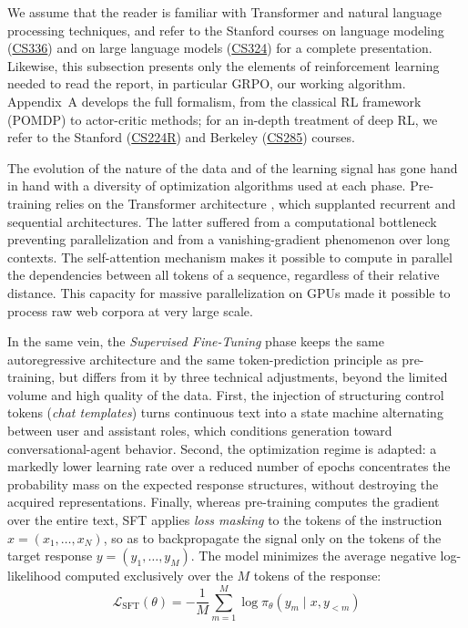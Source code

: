 \documentclass[11pt,a4paper]{article}
\begin{document}
We assume that the reader is familiar with Transformer and natural language processing techniques, and refer to the Stanford courses on language modeling (\href{https://cs336.stanford.edu/}{CS336}) and on large language models (\href{https://stanford-cs324.github.io/winter2022/}{CS324}) for a complete presentation. Likewise, this subsection presents only the elements of reinforcement learning needed to read the report, in particular GRPO, our working algorithm. Appendix~A develops the full formalism, from the classical RL framework (POMDP) to actor-critic methods; for an in-depth treatment of deep RL, we refer to the Stanford (\href{https://cs224r.stanford.edu/}{CS224R}) and Berkeley (\href{https://rail.eecs.berkeley.edu/deeprlcourse/}{CS285}) courses.

The evolution of the nature of the data and of the learning signal has gone hand in hand with a diversity of optimization algorithms used at each phase. Pre-training relies on the Transformer architecture \cite{vaswani2017attention}, which supplanted recurrent and sequential architectures. The latter suffered from a computational bottleneck preventing parallelization and from a vanishing-gradient phenomenon over long contexts. The self-attention mechanism makes it possible to compute in parallel the dependencies between all tokens of a sequence, regardless of their relative distance. This capacity for massive parallelization on GPUs made it possible to process raw web corpora at very large scale.

In the same vein, the \emph{Supervised Fine-Tuning} phase keeps the same autoregressive architecture and the same token-prediction principle as pre-training, but differs from it by three technical adjustments, beyond the limited volume and high quality of the data. First, the injection of structuring control tokens (\emph{chat templates}) turns continuous text into a state machine alternating between user and assistant roles, which conditions generation toward conversational-agent behavior. Second, the optimization regime is adapted: a markedly lower learning rate over a reduced number of epochs concentrates the probability mass on the expected response structures, without destroying the acquired representations. Finally, whereas pre-training computes the gradient over the entire text, SFT applies \emph{loss masking} to the tokens of the instruction $x = (x_1, \dots, x_N)$, so as to backpropagate the signal only on the tokens of the target response $y = (y_1, \dots, y_M)$. The model minimizes the average negative log-likelihood computed exclusively over the $M$ tokens of the response:
\begin{equation}
\mathcal{L}_{\text{SFT}}(\theta) = -\frac{1}{M} \sum_{m=1}^{M} \log \pi_\theta(y_m \mid x, y_{<m})
\end{equation}
\end{document}
